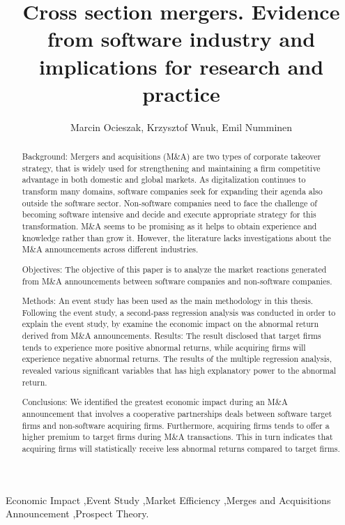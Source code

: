 \documentclass[preprint,10pt]{elsarticle}
\begin{document}
\begin{frontmatter}

\title{Cross section mergers. Evidence from software industry and implications for research and practice}

\author{Marcin Ocieszak, Krzysztof Wnuk, Emil Numminen}

\address{}

\begin{abstract}
Background: Mergers and acquisitions (M\&A) are two types of corporate takeover strategy, that is widely used for strengthening and maintaining a firm competitive advantage in both domestic and global markets. As digitalization continues to transform many domains, software companies seek for expanding their agenda also outside the software sector. Non-software companies need to face the challenge of becoming software intensive and decide and execute appropriate strategy for this transformation. M\&A seems to be promising as it helps to obtain experience and knowledge rather than grow it. However, the literature lacks investigations about the M\&A announcements across different industries. 

Objectives: The objective of this paper is to analyze the market reactions generated from M\&A announcements between software companies and non-software companies.

Methods: An event study has been used as the main methodology in this thesis. Following the event study, a second-pass regression analysis was conducted in order to explain the event study, by examine the economic impact on the abnormal return derived from M\&A announcements.
Results: The result disclosed that target firms tends to experience more positive abnormal returns, while acquiring firms will experience negative abnormal returns. The results of the multiple regression analysis, revealed various significant variables that has high explanatory power to the abnormal return.

Conclusions: We identified the greatest economic impact during an M\&A announcement that involves a cooperative partnerships deals between software target firms and non-software acquiring firms. Furthermore, acquiring firms tends to offer a higher premium to target firms during M\&A transactions. This in turn indicates that acquiring firms will statistically receive less abnormal returns compared to target firms.
\end{abstract}

\begin{keyword}
Economic Impact \sep Event Study \sep Market Efficiency \sep Merges and Acquisitions Announcement \sep Prospect Theory.
\end{keyword}

\end{frontmatter}
\end{document}
